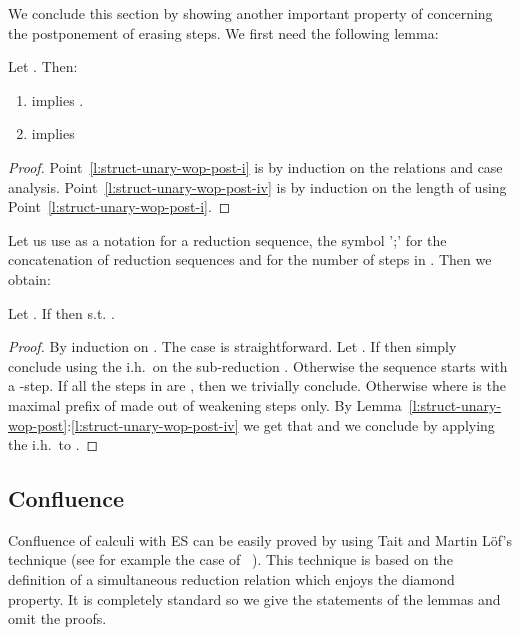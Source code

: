 \documentclass{LMCS}
\renewcommand{\>}{\rightarrow}
\newcommand{\ih}{i.h.}
\begin{document}
We conclude this section by showing
another important property of  concerning
the  postponement  of  erasing  steps. We first need the following lemma:

\begin{lem}
\label{l:struct-unary-wop-post}
Let . Then:
\begin{enumerate}[\rm(1)]
\item \label{l:struct-unary-wop-post-i}  implies . 
\item \label{l:struct-unary-wop-post-iv}  implies 
\end{enumerate}
\end{lem}

\begin{proof}
Point~\ref{l:struct-unary-wop-post-i}
is  by induction on the relations and case analysis.
Point~\ref{l:struct-unary-wop-post-iv} is by induction on the length
of  using 
Point~\ref{l:struct-unary-wop-post-i}.
\end{proof}

Let us use  as a notation for a reduction sequence, the symbol ';' for the concatenation of reduction sequences and  for the number of  steps in . Then we obtain:

\begin{lem}[-postponement]
\label{l:w-postponement}
Let . If  then  s.t. .
\end{lem}

\begin{proof}
By   induction  on  .   The  case     is
  straightforward.  Let .  If 
then   simply   conclude  using   the   \ih\   on  the   sub-reduction
.    Otherwise  the sequence    starts   with  a
  -step. If all the steps  in  are , then we trivially
  conclude.      Otherwise     where
 is  the maximal  prefix of   made out  of weakening
steps  only.   By  Lemma~\ref{l:struct-unary-wop-post}:\ref{l:struct-unary-wop-post-iv}
we  get  that
  and  we  conclude  by  applying  the
\ih\ to .
\end{proof}

\subsection{Confluence}
\label{ss:struct-confluence}
Confluence of calculi with  ES can be easily proved
by using Tait  and Martin L\"of's technique (see for  example the
case of ~\cite{Kes07}). This  technique is based
on the definition of a simultaneous reduction relation
 which enjoys the  diamond property. It is completely standard so we give the statements of the lemmas and omit the proofs. \medskip
\end{document}
